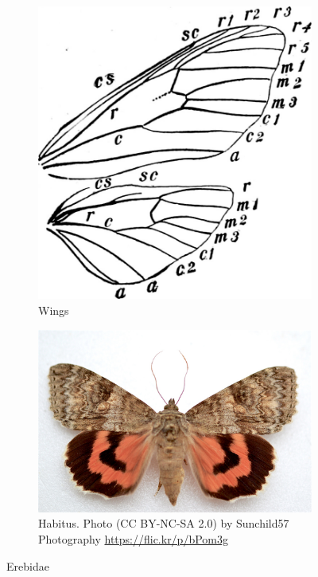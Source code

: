 \documentclass[letterpaper, 11pt]{article}
\begin{document}
\begin{figure}[ht!]
    \centering
    \begin{subfigure}[ht!]{0.36\textwidth}
        \includegraphics[width=\textwidth]{ErebidWings}
        \caption{Wings \citep[][Fig. 450]{bhl83152}}
        \label{fig:erebid1}
    \end{subfigure}
    \hfill %
    \begin{subfigure}[ht!]{0.46\textwidth}
        \includegraphics[width=\textwidth]{ErebidHabitus}
        \caption{Habitus. Photo (CC BY-NC-SA 2.0) by Sunchild57 Photography \url{https://flic.kr/p/bPom3g}}
        \label{fig:erebid2}
    \end{subfigure}
    \caption{Erebidae}\label{fig:erebids}
\end{figure}
\end{document}
